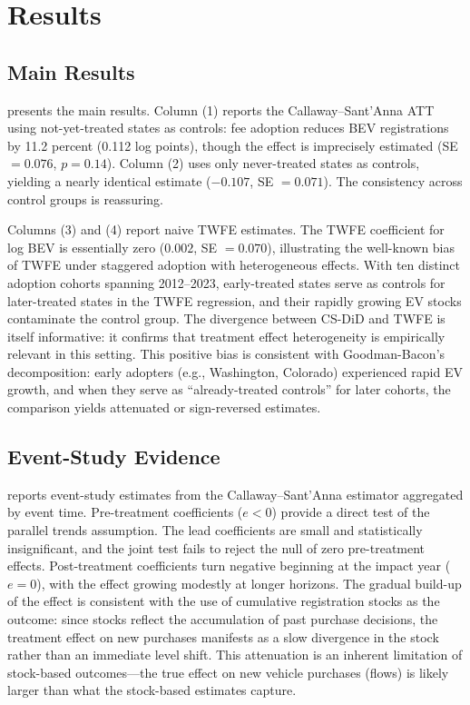 \documentclass[12pt]{article}
\begin{document}
\section{Results}
\label{sec:results}

\subsection{Main Results}



 presents the main results. Column (1) reports the Callaway--Sant'Anna ATT using not-yet-treated states as controls: fee adoption reduces BEV registrations by 11.2 percent (0.112 log points), though the effect is imprecisely estimated (SE $= 0.076$, $p = 0.14$). Column (2) uses only never-treated states as controls, yielding a nearly identical estimate ($-0.107$, SE $= 0.071$). The consistency across control groups is reassuring.

Columns (3) and (4) report naive TWFE estimates. The TWFE coefficient for log BEV is essentially zero ($0.002$, SE $= 0.070$), illustrating the well-known bias of TWFE under staggered adoption with heterogeneous effects. With ten distinct adoption cohorts spanning 2012--2023, early-treated states serve as controls for later-treated states in the TWFE regression, and their rapidly growing EV stocks contaminate the control group. The divergence between CS-DiD and TWFE is itself informative: it confirms that treatment effect heterogeneity is empirically relevant in this setting. This positive bias is consistent with Goodman-Bacon's decomposition: early adopters (e.g., Washington, Colorado) experienced rapid EV growth, and when they serve as ``already-treated controls'' for later cohorts, the comparison yields attenuated or sign-reversed estimates.

\subsection{Event-Study Evidence}



 reports event-study estimates from the Callaway--Sant'Anna estimator aggregated by event time. Pre-treatment coefficients ($e < 0$) provide a direct test of the parallel trends assumption. The lead coefficients are small and statistically insignificant, and the joint test fails to reject the null of zero pre-treatment effects. Post-treatment coefficients turn negative beginning at the impact year ($e = 0$), with the effect growing modestly at longer horizons. The gradual build-up of the effect is consistent with the use of cumulative registration stocks as the outcome: since stocks reflect the accumulation of past purchase decisions, the treatment effect on new purchases manifests as a slow divergence in the stock rather than an immediate level shift. This attenuation is an inherent limitation of stock-based outcomes---the true effect on new vehicle purchases (flows) is likely larger than what the stock-based estimates capture.
\end{document}

